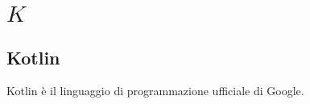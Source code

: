 \section{\quad$K\quad$}
\subsection{Kotlin}
Kotlin è il linguaggio di programmazione ufficiale di Google. 


